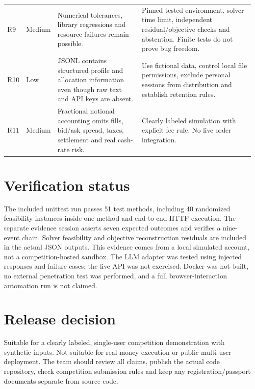 \documentclass[11pt,a4paper]{article}
\begin{document}
\begin{longtable}{p{.08\linewidth}p{.14\linewidth}>{\raggedright\arraybackslash}p{.33\linewidth}>{\raggedright\arraybackslash}p{.33\linewidth}}
R9 & Medium & Numerical tolerances, library regressions and resource failures remain possible. & Pinned tested environment, solver time limit, independent residual/objective checks and abstention. Finite tests do not prove bug freedom.\\
R10 & Low & JSONL contains structured profile and allocation information even though raw text and API keys are absent. & Use fictional data, control local file permissions, exclude personal sessions from distribution and establish retention rules.\\
R11 & Medium & Fractional notional accounting omits fills, bid/ask spread, taxes, settlement and real cash-rate risk. & Clearly labeled simulation with explicit fee rule. No live order integration.\\\bottomrule
\end{longtable}

\normalsize
\section{Verification status}
The included unittest run passes 51 test methods, including 40 randomized feasibility instances inside one method and end-to-end HTTP execution. The separate evidence session asserts seven expected outcomes and verifies a nine-event chain. Solver feasibility and objective reconstruction residuals are included in the actual JSON outputs. This evidence comes from a local simulated account, not a competition-hosted sandbox. The LLM adapter was tested using injected responses and failure cases; the live API was not exercised. Docker was not built, no external penetration test was performed, and a full browser-interaction automation run is not claimed.

\section{Release decision}
Suitable for a clearly labeled, single-user competition demonstration with synthetic inputs. Not suitable for real-money execution or public multi-user deployment. The team should review all claims, publish the actual code repository, check competition submission rules and keep any registration/passport documents separate from source code.
\end{document}
